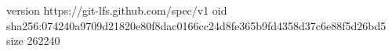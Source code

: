 version https://git-lfs.github.com/spec/v1
oid sha256:074240a9709d21820e80f8dac0166cc24d8fe365b9fd4358d37c6e88f5d26bd5
size 262240
